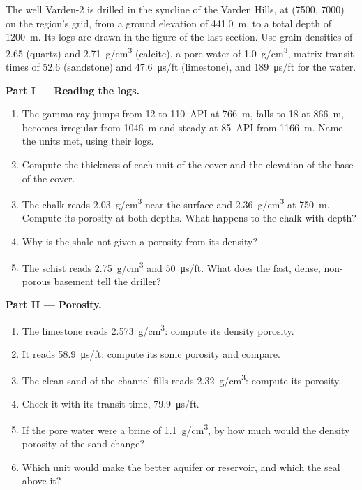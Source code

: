 \begin{problem}
\label{pb:b3:facies-models:1}
The well Varden-2 is drilled in the syncline of the Varden Hills, at
(7500, 7000) on the region's grid, from a ground elevation of
\qty{441.0}{m}, to a total depth of \qty{1200}{m}. Its logs are drawn in the
figure of the last section. Use grain densities of 2.65 (quartz) and
\qty{2.71}{g/cm^3} (calcite), a pore water of \qty{1.0}{g/cm^3}, matrix
transit times of 52.6 (sandstone) and \qty{47.6}{\micro\second/ft}
(limestone), and \qty{189}{\micro\second/ft} for the water.

\medskip\noindent\textbf{Part I --- Reading the logs.}
\begin{enumerate}
\item The gamma ray jumps from 12 to \qty{110}{API} at \qty{766}{m}, falls
  to 18 at \qty{866}{m}, becomes irregular from \qty{1046}{m} and steady at
  \qty{85}{API} from \qty{1166}{m}. Name the units met, using their logs.
\item Compute the thickness of each unit of the cover and the elevation of
  the base of the cover.
\item The chalk reads \qty{2.03}{g/cm^3} near the surface and
  \qty{2.36}{g/cm^3} at \qty{750}{m}. Compute its porosity at both depths.
  What happens to the chalk with depth?
\item Why is the shale not given a porosity from its density?
\item The schist reads \qty{2.75}{g/cm^3} and \qty{50}{\micro\second/ft}.
  What does the fast, dense, non-porous basement tell the driller?
\end{enumerate}

\medskip\noindent\textbf{Part II --- Porosity.}
\begin{enumerate}[resume]
\item The limestone reads \qty{2.573}{g/cm^3}: compute its density porosity.
\item It reads \qty{58.9}{\micro\second/ft}: compute its sonic porosity and
  compare.
\item The clean sand of the channel fills reads \qty{2.32}{g/cm^3}: compute
  its porosity.
\item Check it with its transit time, \qty{79.9}{\micro\second/ft}.
\item If the pore water were a brine of \qty{1.1}{g/cm^3}, by how much would
  the density porosity of the sand change?
\item Which unit would make the better aquifer or reservoir, and which the
  seal above it?
\end{enumerate}


\end{problem}

